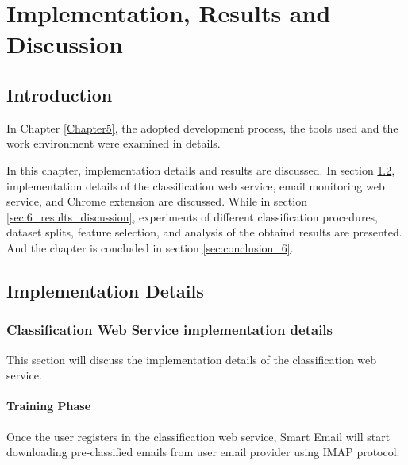 
\chapter{Implementation, Results and Discussion} %

\label{Chapter6} %



\section{Introduction}
In Chapter \ref{Chapter5}, the adopted development process, the tools used and the work environment were examined in details.

In this chapter, implementation details and results are discussed. In section
\ref{sec:6_imp_details}, implementation details of the classification web service,
email monitoring web service, and Chrome extension are discussed. While in section
\ref{sec:6_results_discussion}, experiments of different classification procedures,
dataset splits, feature selection, and analysis of the obtaind results are presented. 
And the chapter is concluded in section \ref{sec:conclusion_6}.

\section{Implementation Details}
\label{sec:6_imp_details}

\subsection{Classification Web Service implementation details}
This section will discuss the implementation details of the classification web service.


    \subsubsection{Training Phase}
    Once the user registers in the classification web service, Smart Email will start downloading pre-classified emails from
    user email provider using IMAP protocol.

